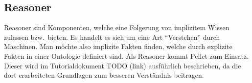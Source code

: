 %







\subsection{Reasoner}
\label{subsec:komponenten_reasoner}

Reasoner sind Komponenten, welche eine Folgerung von implizitem Wissen zulassen bzw.\ bieten. Es handelt es sich um eine Art ``Verstehen'' durch Maschinen. Man möchte also implizite Fakten finden, welche durch explizite Fakten in einer Ontologie definiert sind. 
Als Reasoner kommt Pellet zum Einsatz. Dieser wird im Tutorialdokument TODO (link) ausführlich beschrieben, da die dort erarbeiteten Grundlagen zum besseren Verständnis beitragen.

